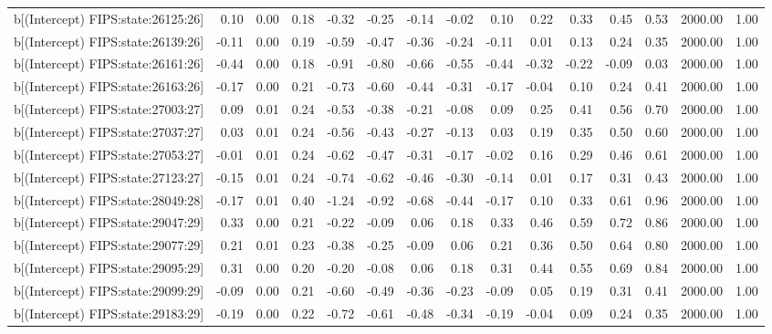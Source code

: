 \begin{table}[ht]
\begin{tabular}{rrrrrrrrrrrrrrr}
  b[(Intercept) FIPS:state:26125:26] & 0.10 & 0.00 & 0.18 & -0.32 & -0.25 & -0.14 & -0.02 & 0.10 & 0.22 & 0.33 & 0.45 & 0.53 & 2000.00 & 1.00 \\ 
  b[(Intercept) FIPS:state:26139:26] & -0.11 & 0.00 & 0.19 & -0.59 & -0.47 & -0.36 & -0.24 & -0.11 & 0.01 & 0.13 & 0.24 & 0.35 & 2000.00 & 1.00 \\ 
  b[(Intercept) FIPS:state:26161:26] & -0.44 & 0.00 & 0.18 & -0.91 & -0.80 & -0.66 & -0.55 & -0.44 & -0.32 & -0.22 & -0.09 & 0.03 & 2000.00 & 1.00 \\ 
  b[(Intercept) FIPS:state:26163:26] & -0.17 & 0.00 & 0.21 & -0.73 & -0.60 & -0.44 & -0.31 & -0.17 & -0.04 & 0.10 & 0.24 & 0.41 & 2000.00 & 1.00 \\ 
  b[(Intercept) FIPS:state:27003:27] & 0.09 & 0.01 & 0.24 & -0.53 & -0.38 & -0.21 & -0.08 & 0.09 & 0.25 & 0.41 & 0.56 & 0.70 & 2000.00 & 1.00 \\ 
  b[(Intercept) FIPS:state:27037:27] & 0.03 & 0.01 & 0.24 & -0.56 & -0.43 & -0.27 & -0.13 & 0.03 & 0.19 & 0.35 & 0.50 & 0.60 & 2000.00 & 1.00 \\ 
  b[(Intercept) FIPS:state:27053:27] & -0.01 & 0.01 & 0.24 & -0.62 & -0.47 & -0.31 & -0.17 & -0.02 & 0.16 & 0.29 & 0.46 & 0.61 & 2000.00 & 1.00 \\ 
  b[(Intercept) FIPS:state:27123:27] & -0.15 & 0.01 & 0.24 & -0.74 & -0.62 & -0.46 & -0.30 & -0.14 & 0.01 & 0.17 & 0.31 & 0.43 & 2000.00 & 1.00 \\ 
  b[(Intercept) FIPS:state:28049:28] & -0.17 & 0.01 & 0.40 & -1.24 & -0.92 & -0.68 & -0.44 & -0.17 & 0.10 & 0.33 & 0.61 & 0.96 & 2000.00 & 1.00 \\ 
  b[(Intercept) FIPS:state:29047:29] & 0.33 & 0.00 & 0.21 & -0.22 & -0.09 & 0.06 & 0.18 & 0.33 & 0.46 & 0.59 & 0.72 & 0.86 & 2000.00 & 1.00 \\ 
  b[(Intercept) FIPS:state:29077:29] & 0.21 & 0.01 & 0.23 & -0.38 & -0.25 & -0.09 & 0.06 & 0.21 & 0.36 & 0.50 & 0.64 & 0.80 & 2000.00 & 1.00 \\ 
  b[(Intercept) FIPS:state:29095:29] & 0.31 & 0.00 & 0.20 & -0.20 & -0.08 & 0.06 & 0.18 & 0.31 & 0.44 & 0.55 & 0.69 & 0.84 & 2000.00 & 1.00 \\ 
  b[(Intercept) FIPS:state:29099:29] & -0.09 & 0.00 & 0.21 & -0.60 & -0.49 & -0.36 & -0.23 & -0.09 & 0.05 & 0.19 & 0.31 & 0.41 & 2000.00 & 1.00 \\ 
  b[(Intercept) FIPS:state:29183:29] & -0.19 & 0.00 & 0.22 & -0.72 & -0.61 & -0.48 & -0.34 & -0.19 & -0.04 & 0.09 & 0.24 & 0.35 & 2000.00 & 1.00 \\ 

\end{tabular}
\end{table}
